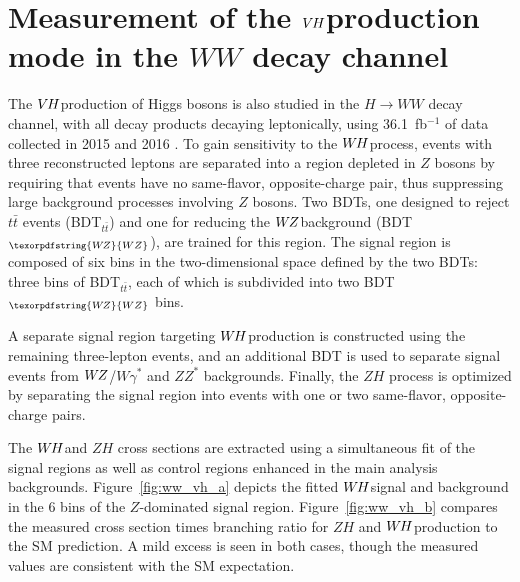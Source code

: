 \documentclass{moriond}
\def\wh{\texorpdfstring{\ensuremath{W\kern -0.1em H}\xspace}{WH\xspace}}
\def\wz{\texorpdfstring{\ensuremath{W\kern -0.1em Z}\xspace}{WZ\xspace}}
\def\vh{\texorpdfstring{\ensuremath{V\kern -0.1em H}\xspace}{VH\xspace}}
\def\zh{\ensuremath{ZH}\xspace}
\def\ttbar{\ensuremath{t\bar{t}}\xspace}
\begin{document}
\section{Measurement of the \vh production mode in the $WW$ decay channel} \label{sec:vh_ww}

The \vh production of Higgs bosons is also studied in the $H{\rightarrow}WW$ decay channel, with all
decay products decaying leptonically,
using 36.1~fb$^{-1}$ of data collected in 2015 and 2016 \cite{HIGG-2017-14}.
To gain sensitivity to the \wh process, events with three reconstructed leptons are separated into
a region depleted in $Z$ bosons by requiring that events have no same-flavor, opposite-charge pair,
thus suppressing large background processes involving $Z$ bosons. Two BDTs, one designed to reject
\ttbar events (BDT$_{\ttbar}$) and one for reducing the \wz background (BDT$_{\wz}$), are trained for
this region. The signal region is composed of six bins in the two-dimensional space defined by the two
BDTs: three bins of BDT$_{\ttbar}$, each of which is subdivided into two BDT$_{\wz}$ bins.

A separate signal region targeting \wh production is constructed using the remaining three-lepton
events, and an additional BDT is used to separate signal events from \wz/$W\gamma^*$ and $ZZ^*$
backgrounds. Finally, the \zh process is optimized by separating the signal region into events with
one or two same-flavor, opposite-charge pairs.

The \wh and \zh cross sections are extracted using a simultaneous fit of the signal regions as well as
control regions enhanced in the main analysis backgrounds.
Figure~\ref{fig:ww_vh_a} depicts the fitted \wh signal and background in the 6 bins of the
$Z$-dominated signal region.
Figure~\ref{fig:ww_vh_b} compares the measured cross section times branching ratio for $ZH$ and \wh production
to the SM prediction. A mild excess is seen in both cases, though the measured values are
consistent with the SM expectation.
\end{document}
